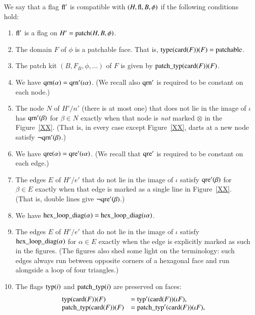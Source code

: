 \begin{definition}
We say that a flag $\op{fl}'$ is compatible with
$(H,\op{fl},B,\phi)$  if the following conditions hold:
    \begin{enumerate}
    \item $\op{fl}'$ is a flag on $H'=\op{patch}(H,B,\phi)$.
    \item The domain $F$ of $\phi$ is a patchable face.  That is,
    $\op{type}(\card(F))(F) = \op{patchable}$.
    \item The patch kit $(B,F_B,\phi,\ldots)$ of $F$ is given by
    $\op{patch\_typ}(\card(F))(F)$.
    \item We have $\op{qrn}(\alpha) = \op{qrn}'(\iota\alpha)$.
    (We recall also $\op{qrn}'$ is required to be constant on each
    node.)
    \item The node $N$ of $H'/n'$ (there is at most one) that does not lie in the image of
    $\iota$ has
        $\op{qrn}'(\beta)$ for $\beta\in N$ exactly when that node
        is {\it not} marked $\otimes$ in the Figure~\ref{XX}.  (That is, in
        every case except Figure~\ref{XX}, darts at a new node satisfy
        $\neg\op{qrn}'(\beta)$.)
    \item We have $\op{qre}(\alpha)= \op{qre}'(\iota\alpha)$.
    (We recall that $\op{qre}'$ is required to be constant on each
    edge.)
    \item The edges $E$ of $H'/e'$ that do not lie in the image of
    $\iota$ satisfy $\op{qre}'(\beta)$ for $\beta\in E$ exactly
    when that edge is marked as a single line in Figure~\ref{XX}.
    (That is, double lines give $\neg\op{qre}'(\beta)$.)
    \item We have $\op{hex\_loop\_diag}(\alpha) =
    \op{hex\_loop\_diag}(\iota\alpha)$.
    \item The edges $E$ of $H'/e'$ that do not lie in the image of
    $\iota$ satisfy $\op{hex\_loop\_diag}(\alpha)$ for $\alpha\in E$
    exactly when the edge is explicitly marked as such in the
    figures.  (The figures also shed some light on the terminology: such
    edges always run between opposite corners of a hexagonal face
    and run alongside a loop of four triangles.)
    \item The flags $\op{typ}(i)$ and
    $\op{patch\_typ}(i)$ are preserved on faces:
        $$
        \begin{array}{lll}
        \op{typ}(\card(F))(F) &= \op{typ}'(\card(F))(\iota F),\\
        \op{patch\_typ}(\card(F))(F) &= \op{patch\_typ}'(\card(F))(\iota F),\\

\end{array}$$
\end{enumerate}
\end{definition}
